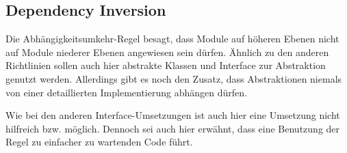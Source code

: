 {	\subsection{Dependency Inversion}
	Die Abhängigkeitsumkehr-Regel besagt, dass Module auf höheren Ebenen nicht auf Module niederer Ebenen angewiesen sein dürfen. Ähnlich zu den anderen Richtlinien sollen auch hier abstrakte Klassen und Interface zur Abstraktion genutzt werden.
	Allerdings gibt es noch den Zusatz, dass Abstraktionen niemals von einer detaillierten Implementierung abhängen dürfen.

	Wie bei den anderen Interface-Umsetzungen ist auch hier eine Umsetzung nicht hilfreich bzw. möglich. Dennoch sei auch hier erwähnt, dass eine Benutzung der Regel zu einfacher zu wartenden Code führt.
}